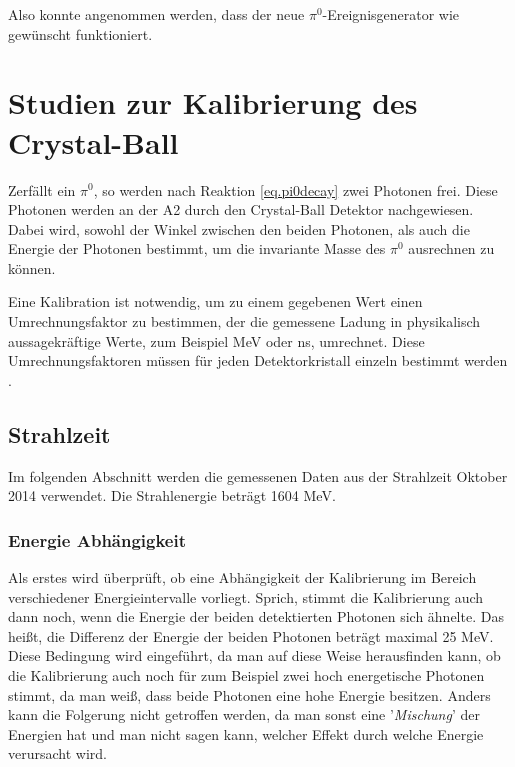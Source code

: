 \documentclass[a4paper,11pt,oneside,final,german,openbib,pdftex]{scrbook}
\begin{document}
{Also konnte angenommen werden, dass der neue $\pi^0$-Ereignisgenerator wie gewünscht funktioniert.











\chapter{Studien zur Kalibrierung des Crystal-Ball}
\label{chap:Studien}

Zerf\"allt ein $\pi^0$, so werden nach Reaktion \ref{eq.pi0decay} zwei Photonen frei. Diese Photonen werden an der A2 durch den Crystal-Ball Detektor nachgewiesen. Dabei wird, sowohl der Winkel zwischen den beiden Photonen, als auch die Energie der Photonen bestimmt, um die invariante Masse des $\pi^0$ ausrechnen zu k\"onnen.
\newline

Eine Kalibration ist notwendig, um zu einem gegebenen Wert einen Umrechnungsfaktor zu bestimmen, der die gemessene Ladung in physikalisch aussagekr\"aftige Werte, zum Beispiel MeV oder ns, umrechnet. Diese Umrechnungsfaktoren m\"ussen f\"ur jeden Detektorkristall einzeln bestimmt werden \cite{Un08}.



\section{Strahlzeit}
\label{sec:Reelle-Daten}

Im folgenden Abschnitt werden die gemessenen Daten aus der Strahlzeit Oktober 2014 verwendet. Die Strahlenergie betr\"agt 1604 MeV. 

\subsection{Energie Abhängigkeit}
\label{sec:Energie-Interval-Abhaengigkeit}

Als erstes wird überprüft, ob eine Abhängigkeit der Kalibrierung im Bereich verschiedener Energieintervalle vorliegt. Sprich, stimmt die Kalibrierung auch dann noch, wenn die Energie der beiden detektierten Photonen sich ähnelte. Das hei{\ss}t, die Differenz der Energie der beiden Photonen betr\"agt maximal 25 MeV. Diese Bedingung wird eingef\"uhrt, da man auf diese Weise herausfinden kann, ob die Kalibrierung auch noch f\"ur zum Beispiel zwei hoch energetische Photonen stimmt, da man wei{\ss}, dass beide Photonen eine hohe Energie besitzen. Anders kann die Folgerung nicht getroffen werden, da man sonst eine '\textit{Mischung}' der Energien hat und man nicht sagen kann, welcher Effekt durch welche Energie verursacht wird.

}
\end{document}
